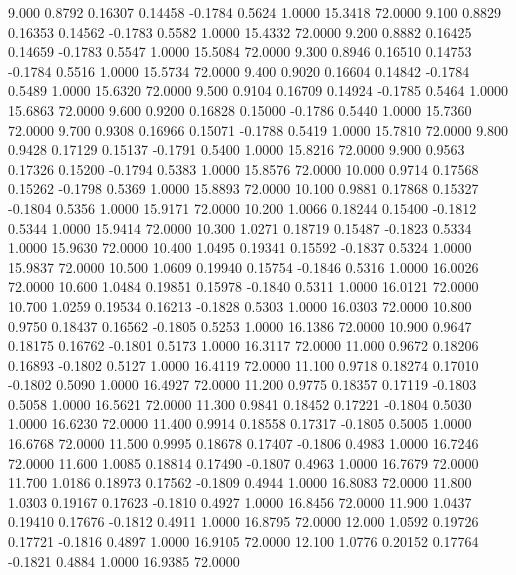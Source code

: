    9.000   0.8792   0.16307   0.14458  -0.1784   0.5624   1.0000  15.3418  72.0000
   9.100   0.8829   0.16353   0.14562  -0.1783   0.5582   1.0000  15.4332  72.0000
   9.200   0.8882   0.16425   0.14659  -0.1783   0.5547   1.0000  15.5084  72.0000
   9.300   0.8946   0.16510   0.14753  -0.1784   0.5516   1.0000  15.5734  72.0000
   9.400   0.9020   0.16604   0.14842  -0.1784   0.5489   1.0000  15.6320  72.0000
   9.500   0.9104   0.16709   0.14924  -0.1785   0.5464   1.0000  15.6863  72.0000
   9.600   0.9200   0.16828   0.15000  -0.1786   0.5440   1.0000  15.7360  72.0000
   9.700   0.9308   0.16966   0.15071  -0.1788   0.5419   1.0000  15.7810  72.0000
   9.800   0.9428   0.17129   0.15137  -0.1791   0.5400   1.0000  15.8216  72.0000
   9.900   0.9563   0.17326   0.15200  -0.1794   0.5383   1.0000  15.8576  72.0000
  10.000   0.9714   0.17568   0.15262  -0.1798   0.5369   1.0000  15.8893  72.0000
  10.100   0.9881   0.17868   0.15327  -0.1804   0.5356   1.0000  15.9171  72.0000
  10.200   1.0066   0.18244   0.15400  -0.1812   0.5344   1.0000  15.9414  72.0000
  10.300   1.0271   0.18719   0.15487  -0.1823   0.5334   1.0000  15.9630  72.0000
  10.400   1.0495   0.19341   0.15592  -0.1837   0.5324   1.0000  15.9837  72.0000
  10.500   1.0609   0.19940   0.15754  -0.1846   0.5316   1.0000  16.0026  72.0000
  10.600   1.0484   0.19851   0.15978  -0.1840   0.5311   1.0000  16.0121  72.0000
  10.700   1.0259   0.19534   0.16213  -0.1828   0.5303   1.0000  16.0303  72.0000
  10.800   0.9750   0.18437   0.16562  -0.1805   0.5253   1.0000  16.1386  72.0000
  10.900   0.9647   0.18175   0.16762  -0.1801   0.5173   1.0000  16.3117  72.0000
  11.000   0.9672   0.18206   0.16893  -0.1802   0.5127   1.0000  16.4119  72.0000
  11.100   0.9718   0.18274   0.17010  -0.1802   0.5090   1.0000  16.4927  72.0000
  11.200   0.9775   0.18357   0.17119  -0.1803   0.5058   1.0000  16.5621  72.0000
  11.300   0.9841   0.18452   0.17221  -0.1804   0.5030   1.0000  16.6230  72.0000
  11.400   0.9914   0.18558   0.17317  -0.1805   0.5005   1.0000  16.6768  72.0000
  11.500   0.9995   0.18678   0.17407  -0.1806   0.4983   1.0000  16.7246  72.0000
  11.600   1.0085   0.18814   0.17490  -0.1807   0.4963   1.0000  16.7679  72.0000
  11.700   1.0186   0.18973   0.17562  -0.1809   0.4944   1.0000  16.8083  72.0000
  11.800   1.0303   0.19167   0.17623  -0.1810   0.4927   1.0000  16.8456  72.0000
  11.900   1.0437   0.19410   0.17676  -0.1812   0.4911   1.0000  16.8795  72.0000
  12.000   1.0592   0.19726   0.17721  -0.1816   0.4897   1.0000  16.9105  72.0000
  12.100   1.0776   0.20152   0.17764  -0.1821   0.4884   1.0000  16.9385  72.0000
